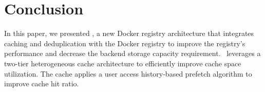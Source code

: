 \section{Conclusion}
\label{sec:conclusion}
In this paper, we presented \sysname, a new Docker registry architecture that integrates caching and deduplication with the Docker registry to
improve the registry's performance and decrease the backend storage capacity requirement. 
\sysname~leverages a two-tier heterogeneous cache architecture to efficiently improve cache space 
utilization. The cache applies a user access history-based prefetch algorithm to improve cache hit ratio.

